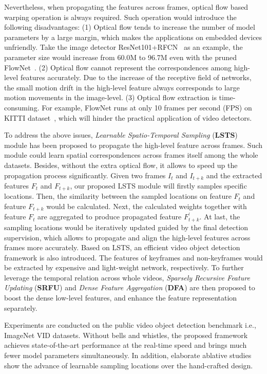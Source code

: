 \documentclass[runningheads]{llncs}
\begin{document}
Nevertheless, when propagating the features across frames, optical flow based warping operation is always required. Such operation would introduce the following disadvantages: (1) Optical flow tends to increase the number of model parameters by a large margin, which makes the applications on embedded devices unfriendly. Take the image detector ResNet101+RFCN~\cite{he2016deep,dai2016r} as an example, the parameter size would increase from 60.0M to 96.7M even with the pruned FlowNet~\cite{zhu2017deep}. (2) Optical flow cannot represent the correspondences among high-level features accurately. Due to the increase of the receptive field of networks, the small motion drift in the high-level feature always corresponds to large motion movements in the image-level. (3) Optical flow extraction is time-consuming. For example, FlowNet\cite{dosovitskiy2015flownet} runs at only 10 frames per second (FPS) on KITTI dataset~\cite{geiger2013vision}, which will hinder the practical application of video detectors.

To address the above issues, \textit{Learnable Spatio-Temporal Sampling} (\textbf{LSTS}) module has been proposed to propagate the high-level feature across frames. Such module could learn spatial correspondences across frames itself among the whole datasets. Besides, without the extra optical flow, it allows to speed up the propagation process significantly. Given two frames $I_t$ and $I_{t+k}$ and the extracted features $F_t$ and $F_{t+k}$, our proposed LSTS module will firstly samples specific locations. Then, the similarity between the sampled locations on feature $F_t$ and feature $F_{t+k}$ would be calculated. Next, the calculated weights together with feature $F_t$ are aggregated to produce propagated feature $F_{t+k}^{'}$. At last, the sampling locations would be iteratively updated guided by the final detection supervision, which allows to propagate and align the high-level features across frames more accurately. Based on LSTS, an efficient video object detection framework is also introduced. The features of keyframes and non-keyframes would be extracted by expensive and light-weight network, respectively. To further leverage the temporal relation across whole videos, \textit{Sparsely Recursive Feature Updating} (\textbf{SRFU}) and \textit{Dense Feature Aggregation} (\textbf{DFA}) are then proposed to boost the dense low-level features, and enhance the feature representation separately. 

Experiments are conducted on the public video object detection benchmark i.e., ImageNet VID datasets. Without bells and whistles, the proposed framework achieves state-of-the-art performance at the real-time speed and brings much fewer model parameters simultaneously. In addition, elaborate ablative studies show the advance of learnable sampling locations over the hand-crafted design. 
\end{document}
